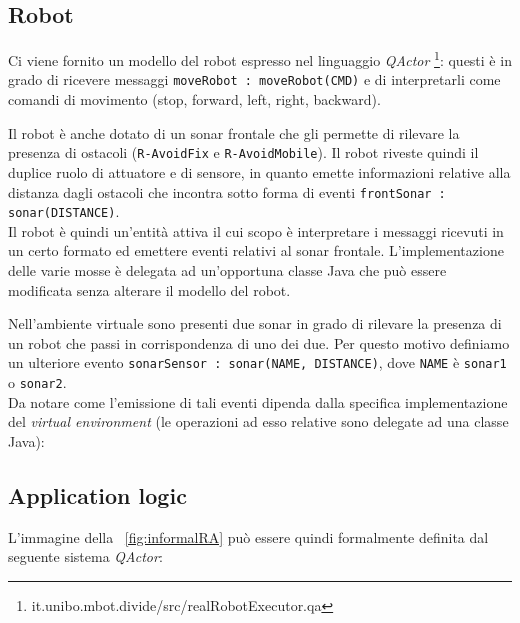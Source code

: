 \documentclass{../llncs}
\newcommand{\codescript}[1]{{\mbox{\small{\texttt{#1}}}}\xspace}
\newcommand{\code}[1]{{\color{blue}\small{\texttt{#1}}}}
\newcommand{\qa}{\textsf{\textit{QActor}}\xspace}
\newcommand{\xf}[1]{\figurename~\ref{fig:#1}}
\begin{document}


\subsection{Robot}
Ci viene fornito un modello del robot espresso nel linguaggio \qa
\footnote{it.unibo.mbot.divide/src/realRobotExecutor.qa}: questi è in grado di ricevere messaggi \codescript{moveRobot : moveRobot(CMD)} e di interpretarli come comandi di movimento (stop, forward, left, right, backward).

Il robot è anche dotato di un sonar frontale che gli permette di rilevare la presenza di ostacoli (\code{R-AvoidFix} e \code{R-AvoidMobile}). Il robot riveste quindi il duplice ruolo di attuatore e di sensore, in quanto emette informazioni relative alla distanza dagli ostacoli che incontra sotto forma di eventi \codescript{frontSonar : sonar(DISTANCE)}.\\

Il robot è quindi un'entità attiva il cui scopo è interpretare i messaggi ricevuti in un certo formato ed emettere eventi relativi al sonar frontale. L'implementazione delle varie mosse è delegata ad un'opportuna classe Java che può essere modificata senza alterare il modello del robot.\\



\vspace{8px}

Nell'ambiente virtuale sono presenti due sonar in grado di rilevare la presenza di un robot che passi in corrispondenza di uno dei due. Per questo motivo definiamo un ulteriore evento \codescript{sonarSensor : sonar(NAME, DISTANCE)}, dove \codescript{NAME} è \code{sonar1} o \code{sonar2}.\\

Da notare come l'emissione di tali eventi dipenda dalla specifica implementazione del \textit{virtual environment} (le operazioni ad esso relative sono delegate ad una classe Java):



\subsection{Application logic}
L'immagine della \xf{informalRA} può essere quindi formalmente definita dal seguente sistema {\qa}:\\
\end{document}
